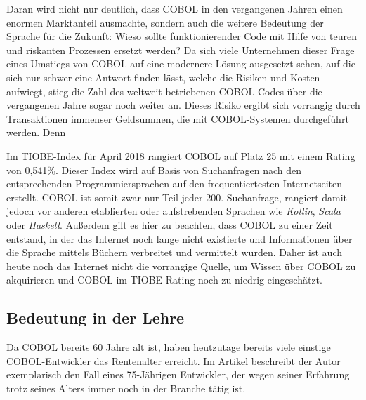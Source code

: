 Daran wird nicht nur deutlich, dass COBOL in den vergangenen Jahren einen enormen Marktanteil ausmachte, sondern auch die weitere Bedeutung der Sprache für die Zukunft: Wieso sollte funktionierender Code mit Hilfe von teuren und riskanten Prozessen ersetzt werden? Da sich viele Unternehmen dieser Frage eines Umstiegs von COBOL auf eine modernere Lösung ausgesetzt sehen, auf die sich nur schwer eine Antwort finden lässt, welche die Risiken und Kosten aufwiegt, stieg die Zahl des weltweit betriebenen COBOL-Codes über die vergangenen Jahre sogar noch weiter an. Dieses Risiko ergibt sich vorrangig durch Transaktionen immenser Geldsummen, die mit COBOL-Systemen durchgeführt werden. Denn  \cite{beat_balzli_cobol-programmierer_2017}

Im TIOBE-Index \cite{_tiobe_} für April 2018 rangiert COBOL auf Platz 25 mit einem Rating von 0,541\%. Dieser Index wird auf Basis von Suchanfragen nach den entsprechenden Programmiersprachen auf den frequentiertesten Internetseiten erstellt. COBOL ist somit zwar nur Teil jeder 200. Suchanfrage, rangiert damit jedoch vor anderen etablierten oder aufstrebenden Sprachen wie \textit{Kotlin}, \textit{Scala} oder \textit{Haskell}. Außerdem gilt es hier zu beachten, dass COBOL zu einer Zeit entstand, in der das Internet noch lange nicht existierte und Informationen über die Sprache mittels Büchern verbreitet und vermittelt wurden. Daher ist auch heute noch das Internet nicht die vorrangige Quelle, um Wissen über COBOL zu akquirieren und COBOL im TIOBE-Rating noch zu niedrig eingeschätzt.


\subsection*{Bedeutung in der Lehre}
Da COBOL bereits 60 Jahre alt ist, haben heutzutage bereits viele einstige COBOL-Entwickler das Rentenalter erreicht. Im Artikel  beschreibt der Autor exemplarisch den Fall eines 75-Jährigen Entwickler, der wegen seiner Erfahrung trotz seines Alters immer noch in der Branche tätig ist.

